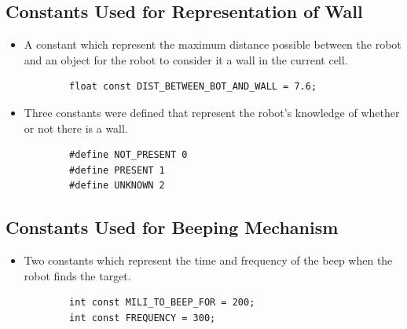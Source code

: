 \documentclass[11pt]{article}
\begin{document}

\subsection{Constants Used for Representation of Wall}
\begin{itemize}
\item A constant which represent the maximum distance possible between the robot and an object for the robot to consider it a wall in the current cell.
	\begin{verbatim}
		float const DIST_BETWEEN_BOT_AND_WALL = 7.6;
	\end{verbatim}
\item Three constants were defined that represent the robot's knowledge of whether or not there is a wall. 
	\begin{verbatim}
		#define NOT_PRESENT 0 
		#define PRESENT 1
		#define UNKNOWN 2
	\end{verbatim}
\end{itemize}


\subsection{Constants Used for Beeping Mechanism}
\begin{itemize}
\item Two constants which represent the time and frequency of the beep when the robot finds the target.
	\begin{verbatim}
		int const MILI_TO_BEEP_FOR = 200;
		int const FREQUENCY = 300;
	\end{verbatim}
\end{itemize}

\newpage

\end{document}

